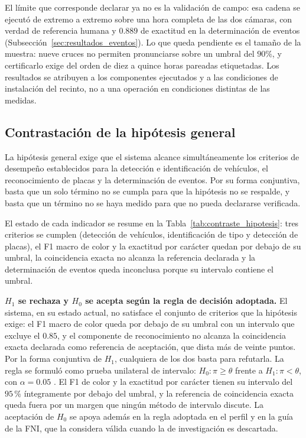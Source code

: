 El límite que corresponde declarar ya no es la validación de campo: esa cadena se
ejecutó de extremo a extremo sobre una hora completa de las dos cámaras, con verdad
de referencia humana y $0{.}889$ de exactitud en la determinación de eventos
(Subsección~\ref{sec:resultados_eventos}). Lo que queda pendiente es el tamaño de la
muestra: nueve cruces no permiten pronunciarse sobre un umbral del $90\%$, y
certificarlo exige del orden de diez a quince horas pareadas etiquetadas. Los
resultados se atribuyen a los componentes ejecutados y a las condiciones de
instalación del recinto, no a una operación en condiciones distintas de las
medidas.

\subsection{Contrastación de la hipótesis general}

La hipótesis general exige que el sistema alcance simultáneamente los criterios
de desempeño establecidos para la detección e identificación de vehículos, el
reconocimiento de placas y la determinación de eventos. Por su forma conjuntiva,
basta que un solo término no se cumpla para que la hipótesis no se respalde, y
basta que un término no se haya medido para que no pueda declararse verificada.

El estado de cada indicador se resume en la Tabla~\ref{tab:contraste_hipotesis}:
tres criterios se cumplen (detección de vehículos, identificación de tipo y
detección de placas), el F1 macro de color y la exactitud por carácter quedan por
debajo de su umbral, la coincidencia exacta no alcanza la
referencia declarada y la determinación de eventos queda inconclusa porque su
intervalo contiene el umbral.

\textbf{$H_1$ se rechaza y $H_0$ se acepta según la regla de decisión adoptada.}
El sistema, en su estado actual, no satisface el conjunto de criterios que la
hipótesis exige: el F1 macro de color queda por debajo de su umbral con un
intervalo que excluye el $0{.}85$, y el componente de reconocimiento no alcanza la
coincidencia exacta declarada como referencia de aceptación, que dista más de
veinte puntos. Por la forma conjuntiva de $H_1$, cualquiera de los dos basta para
refutarla. La regla se formuló como prueba unilateral de intervalo:
$H_0:\pi\ge\theta$ frente a $H_1:\pi<\theta$, con $\alpha=0{.}05$
\cite{schuirmann1987comparison,lakens2017equivalence}. El F1 de color y la
exactitud por carácter tienen su intervalo del $95$\,\% íntegramente por debajo del
umbral, y la referencia de coincidencia exacta queda fuera por un margen que
ningún método de intervalo discute. La aceptación de
$H_0$ se apoya además en la regla adoptada en el perfil y en la guía de la FNI, que
la considera válida cuando la de investigación es descartada.

